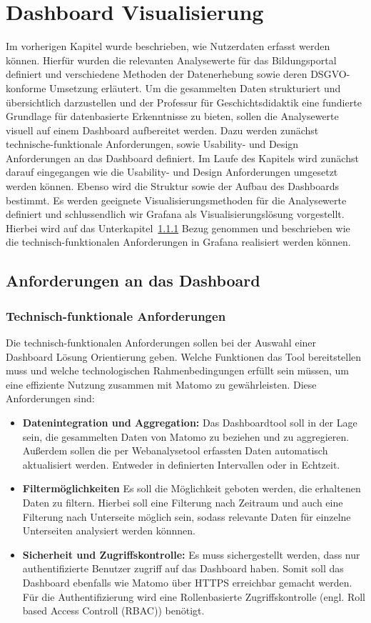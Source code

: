 \chapter{Dashboard Visualisierung} %
\label{ch:auswahl}
Im vorherigen Kapitel wurde beschrieben, wie Nutzerdaten erfasst werden können. Hierfür wurden die relevanten Analysewerte für das Bildungsportal definiert und verschiedene Methoden der Datenerhebung sowie deren DSGVO-konforme Umsetzung erläutert. Um die gesammelten Daten strukturiert und übersichtlich darzustellen und der Professur für Geschichtsdidaktik eine fundierte Grundlage für datenbasierte Erkenntnisse zu bieten, sollen die Analysewerte visuell auf einem Dashboard aufbereitet werden. Dazu werden zunächst technische-funktionale Anforderungen, sowie Usability- und Design Anforderungen an das Dashboard definiert. Im Laufe des Kapitels wird zunächst darauf eingegangen wie die Usability- und Design Anforderungen umgesetzt werden können. Ebenso wird die Struktur sowie der Aufbau des Dashboards bestimmt. Es werden geeignete Visualisierungsmethoden für die Analysewerte definiert und schlussendlich wir Grafana als Visualisierungslösung vorgestellt. Hierbei wird auf das Unterkapitel~\ref{sssec:technfunk} Bezug genommen und beschrieben wie die technisch-funktionalen Anforderungen in Grafana realisiert werden können.

\section{Anforderungen an das Dashboard}
\label{sec:anforderungen}
\subsection{Technisch-funktionale Anforderungen}
\label{sssec:technfunk}
Die technisch-funktionalen Anforderungen sollen bei der Auswahl einer Dashboard Lösung Orientierung geben. Welche Funktionen das Tool bereitstellen muss und welche technologischen Rahmenbedingungen erfüllt sein müssen, um eine effiziente Nutzung zusammen mit Matomo zu gewährleisten. Diese Anforderungen sind: 
\begin{itemize}
    \item \textbf{Datenintegration und Aggregation:} Das Dashboardtool soll in der Lage sein, die gesammelten Daten von Matomo zu beziehen und zu aggregieren. Außerdem sollen die per Webanalysetool erfassten Daten automatisch aktualisiert werden. Entweder in definierten Intervallen oder in Echtzeit.
    \item \textbf{Filtermöglichkeiten} Es soll die Möglichkeit geboten werden, die erhaltenen Daten zu filtern. Hierbei soll eine Filterung nach Zeitraum und auch eine Filterung nach Unterseite möglich sein, sodass relevante Daten für einzelne Unterseiten analysiert werden könnnen. 
    \item \textbf{Sicherheit und Zugriffskontrolle:} Es muss sichergestellt werden, dass nur authentifizierte Benutzer zugriff auf das Dashboard haben. Somit soll das Dashboard ebenfalls wie Matomo über HTTPS erreichbar gemacht werden. Für die Authentifizierung wird eine Rollenbasierte Zugriffskontrolle (engl. Roll based Access Controll (RBAC)) benötigt.
\end{itemize}

